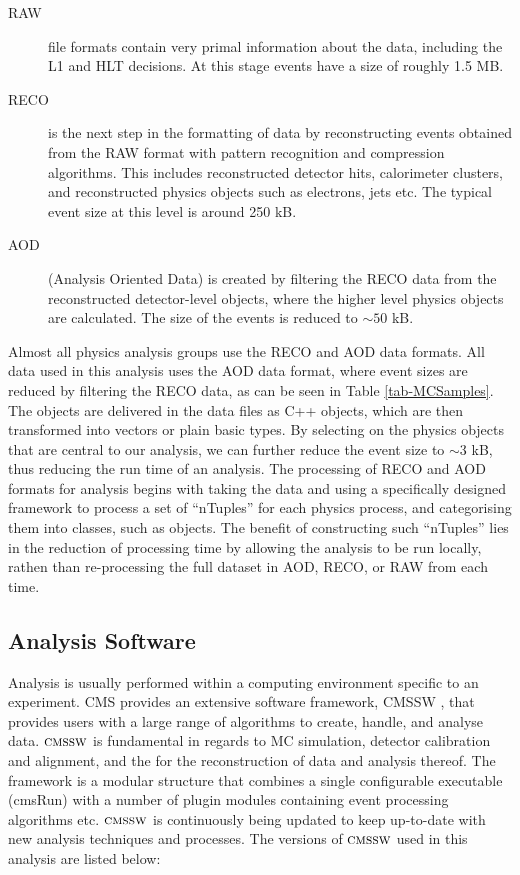 \begin{description}
	\item[RAW] file formats contain very primal information about the data, including the L1 and HLT decisions. At this stage events have a size of roughly 1.5 MB. 
	\item[RECO] is the next step in the formatting of data by reconstructing events obtained from the RAW format with pattern recognition and compression algorithms. This includes reconstructed detector hits, calorimeter clusters, and reconstructed physics objects such as electrons, jets etc. The typical event size at this level is around 250 kB.
	\item[AOD] (Analysis Oriented Data) is created by filtering the RECO data from the reconstructed detector-level objects, where the higher level physics objects are calculated. The size of the events is reduced to $\sim50$ kB.	
\end{description}

Almost all physics analysis groups use the RECO and AOD data formats. All data used in this analysis uses the AOD data format, where event sizes are reduced by filtering the RECO data, as can be seen in Table \ref{tab-MCSamples}. The objects are delivered in the data files as C++ objects, which are then transformed into vectors or plain basic types. By selecting on the physics objects that are central to our analysis, we can further reduce the event size to $\sim$3 kB, thus reducing the run time of an analysis. The processing of RECO and AOD formats for analysis begins with taking the data and using a specifically designed framework to process a set of ``nTuples'' for each physics process, and categorising them into classes, such as objects. The benefit of constructing such ``nTuples'' lies in the reduction of processing time by allowing the analysis to be run locally, rathen than re-processing the full dataset in AOD, RECO, or RAW from each time. 

\subsection{Analysis Software} \label{subsec-AnalysisSoftware}

Analysis is usually performed within a computing environment specific to an experiment. CMS provides an extensive software framework, CMSSW \cite{CMSSW}, that provides users with a large range of algorithms to create, handle, and analyse data. ${\textsc{cmssw}}$ is fundamental in regards to MC simulation, detector calibration and alignment, and the for the reconstruction of data and analysis thereof. The framework is a modular structure that combines a single configurable executable (cmsRun) with a number of plugin modules containing event processing algorithms etc. ${\textsc{cmssw}}$ is continuously being updated to keep up-to-date with new analysis techniques and processes. The versions of ${\textsc{cmssw}}$ used in this analysis are listed below:

